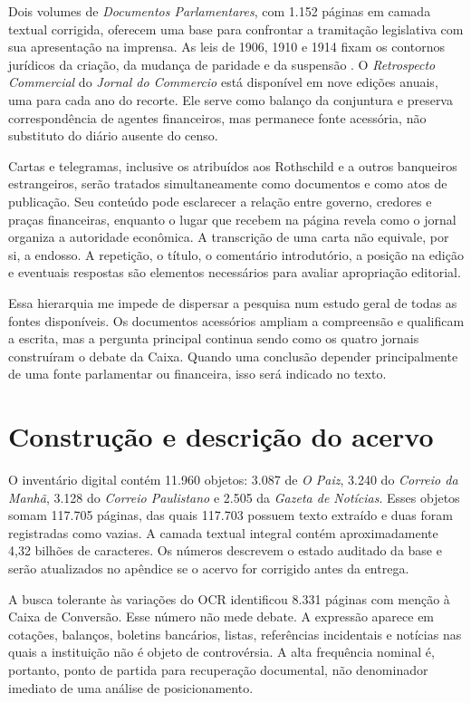 Dois volumes de \textit{Documentos Parlamentares}, com 1.152 páginas em camada textual corrigida, oferecem uma base para confrontar a tramitação legislativa com sua apresentação na imprensa. As leis de 1906, 1910 e 1914 fixam os contornos jurídicos da criação, da mudança de paridade e da suspensão \cite{brasil1906caixa,brasil1910taxa16,brasil1914suspensao}. O \textit{Retrospecto Commercial} do \textit{Jornal do Commercio} está disponível em nove edições anuais, uma para cada ano do recorte. Ele serve como balanço da conjuntura e preserva correspondência de agentes financeiros, mas permanece fonte acessória, não substituto do diário ausente do censo.

Cartas e telegramas, inclusive os atribuídos aos Rothschild e a outros banqueiros estrangeiros, serão tratados simultaneamente como documentos e como atos de publicação. Seu conteúdo pode esclarecer a relação entre governo, credores e praças financeiras, enquanto o lugar que recebem na página revela como o jornal organiza a autoridade econômica. A transcrição de uma carta não equivale, por si, a endosso. A repetição, o título, o comentário introdutório, a posição na edição e eventuais respostas são elementos necessários para avaliar apropriação editorial.

Essa hierarquia me impede de dispersar a pesquisa num estudo geral de todas as fontes disponíveis. Os documentos acessórios ampliam a compreensão e qualificam a escrita, mas a pergunta principal continua sendo como os quatro jornais construíram o debate da Caixa. Quando uma conclusão depender principalmente de uma fonte parlamentar ou financeira, isso será indicado no texto.

\section{Construção e descrição do acervo}

O inventário digital contém 11.960 objetos: 3.087 de \textit{O Paiz}, 3.240 do \textit{Correio da Manhã}, 3.128 do \textit{Correio Paulistano} e 2.505 da \textit{Gazeta de Notícias}. Esses objetos somam 117.705 páginas, das quais 117.703 possuem texto extraído e duas foram registradas como vazias. A camada textual integral contém aproximadamente 4,32 bilhões de caracteres. Os números descrevem o estado auditado da base e serão atualizados no apêndice se o acervo for corrigido antes da entrega.

A busca tolerante às variações do OCR identificou 8.331 páginas com menção à Caixa de Conversão. Esse número não mede debate. A expressão aparece em cotações, balanços, boletins bancários, listas, referências incidentais e notícias nas quais a instituição não é objeto de controvérsia. A alta frequência nominal é, portanto, ponto de partida para recuperação documental, não denominador imediato de uma análise de posicionamento.

